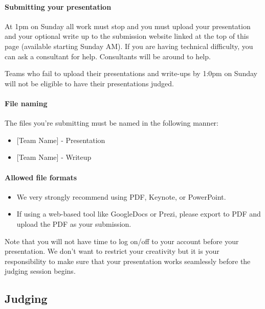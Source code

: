 \documentclass[]{article}
\providecommand{\tightlist}{%
  \setlength{\itemsep}{0pt}\setlength{\parskip}{0pt}}
\let\oldparagraph\paragraph
\renewcommand{\paragraph}[1]{\oldparagraph{#1}\mbox{}}
\begin{document}
\hypertarget{submitting-your-presentation}{%
\paragraph{Submitting your
presentation}\label{submitting-your-presentation}}

At 1pm on Sunday all work must stop and you must upload your
presentation and your optional write up to the submission website linked
at the top of this page (available starting Sunday AM). If you are
having technical difficulty, you can ask a consultant for help.
Consultants will be around to help.

Teams who fail to upload their presentations and write-ups by 1:0pm on
Sunday will not be eligible to have their presentations judged.

\hypertarget{file-naming}{%
\paragraph{File naming}\label{file-naming}}

The files you're submitting must be named in the following manner:

\begin{itemize}
\tightlist
\item
  {[}Team Name{]} - Presentation
\item
  {[}Team Name{]} - Writeup
\end{itemize}

\hypertarget{allowed-file-formats}{%
\paragraph{Allowed file formats}\label{allowed-file-formats}}

\begin{itemize}
\tightlist
\item
  We very strongly recommend using PDF, Keynote, or PowerPoint.
\item
  If using a web-based tool like GoogleDocs or Prezi, please export to
  PDF and upload the PDF as your submission.
\end{itemize}

Note that you will not have time to log on/off to your account before
your presentation. We don't want to restrict your creativity but it is
your responsibility to make sure that your presentation works seamlessly
before the judging session begins.

\hypertarget{judging}{%
\subsection{Judging}\label{judging}}
\end{document}
